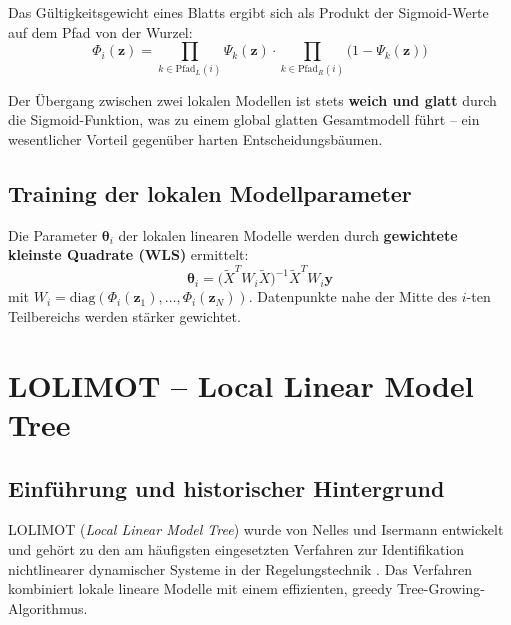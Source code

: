 \documentclass[11pt,a4paper]{report}
\begin{document}
Das G\"{u}ltigkeitsgewicht eines Blatts ergibt sich als Produkt der Sigmoid-Werte auf dem
Pfad von der Wurzel:
\begin{equation}
\Phi_i(\mathbf{z}) = \prod_{k \in \text{Pfad}_L(i)} \Psi_k(\mathbf{z}) \cdot
                     \prod_{k \in \text{Pfad}_R(i)} \bigl(1 - \Psi_k(\mathbf{z})\bigr)
\label{eq:validity_weight}
\end{equation}

\begin{hinweisbox}
Der \"{U}bergang zwischen zwei lokalen Modellen ist stets \textbf{weich und glatt} durch die
Sigmoid-Funktion, was zu einem global glatten Gesamtmodell f\"{u}hrt -- ein wesentlicher
Vorteil gegen\"{u}ber harten Entscheidungsb\"{a}umen.
\end{hinweisbox}

\section{Training der lokalen Modellparameter}

Die Parameter $\boldsymbol{\theta}_i$ der lokalen linearen Modelle werden durch
\textbf{gewichtete kleinste Quadrate (WLS)} ermittelt:
\begin{equation}
\boldsymbol{\theta}_i = \bigl(\tilde{X}^T W_i \tilde{X}\bigr)^{-1} \tilde{X}^T W_i \mathbf{y}
\label{eq:wls}
\end{equation}
mit $W_i = \mathrm{diag}(\Phi_i(\mathbf{z}_1), \ldots, \Phi_i(\mathbf{z}_N))$.
Datenpunkte nahe der Mitte des $i$-ten Teilbereichs werden st\"{a}rker gewichtet.

\chapter{LOLIMOT -- Local Linear Model Tree}

\section{Einf\"{u}hrung und historischer Hintergrund}

LOLIMOT (\emph{Local Linear Model Tree}) wurde von Nelles und Isermann entwickelt und geh\"{o}rt
zu den am h\"{a}ufigsten eingesetzten Verfahren zur Identifikation nichtlinearer dynamischer
Systeme in der Regelungstechnik \cite{nelles2001}. Das Verfahren kombiniert lokale lineare
Modelle mit einem effizienten, greedy Tree-Growing-Algorithmus.
\end{document}
